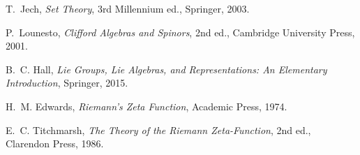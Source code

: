 \documentclass[11pt]{article}
\begin{document}
\bigskip

\begin{thebibliography}{9}

T.~Jech, \emph{Set Theory}, 3rd Millennium ed., Springer, 2003.

P.~Lounesto, \emph{Clifford Algebras and Spinors}, 2nd ed., Cambridge University Press, 2001.

B.~C. Hall, \emph{Lie Groups, Lie Algebras, and Representations: An Elementary Introduction}, Springer, 2015.

H.~M. Edwards, \emph{Riemann's Zeta Function}, Academic Press, 1974.

E.~C. Titchmarsh, \emph{The Theory of the Riemann Zeta-Function}, 2nd ed., Clarendon Press, 1986.

\end{thebibliography}
\end{document}
